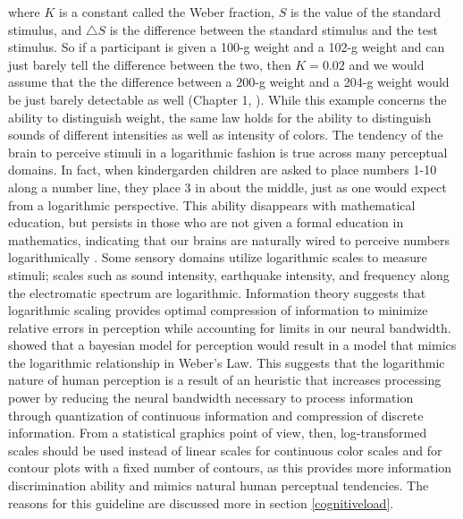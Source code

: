 \documentclass[11pt]{isuthesis}\usepackage[]{graphicx}\usepackage[]{color}
\begin{document}
where $K$ is a constant called the Weber fraction, $S$ is the value of the standard stimulus, and $\triangle S$ is the difference between the standard stimulus and the test stimulus. So if a participant is given a 100-g weight and a 102-g weight and can just barely tell the difference between the two, then $K=0.02$ and we would assume that the the difference between a 200-g weight and a 204-g weight would be just barely detectable as well (Chapter 1, \citealt{goldstein}). While this example concerns the ability to distinguish weight, the same law holds for the ability to distinguish sounds of different intensities as well as intensity of colors. The tendency of the brain to perceive stimuli in a logarithmic fashion is true across many perceptual domains. In fact, when kindergarden children are asked to place numbers 1-10 along a number line, they place 3 in about the middle, just as one would expect from a logarithmic perspective. This ability disappears with mathematical education, but persists in those who are not given a formal education in mathematics, indicating that our brains are naturally wired to perceive numbers logarithmically \citep{varshney2013we}. Some sensory domains utilize logarithmic scales to measure stimuli; scales such as sound intensity, earthquake intensity, and frequency along the electromatic spectrum are logarithmic. Information theory suggests that logarithmic scaling provides optimal compression of information to minimize relative errors in perception while accounting for limits in our neural bandwidth. \citet{sun2012framework, varshney2013we} showed that a bayesian model for perception would result in a model that mimics the logarithmic relationship in Weber's Law. This suggests that the logarithmic nature of human perception is a result of an heuristic that increases processing power by reducing the neural bandwidth necessary to process information through quantization of continuous information and compression of discrete information. From a statistical graphics point of view, then, log-transformed scales should be used instead of linear scales for continuous color scales and for contour plots with a fixed number of contours, as this provides more information discrimination ability and mimics natural human perceptual tendencies. The reasons for this guideline are discussed more in section \ref{cognitiveload}.
\end{document}
